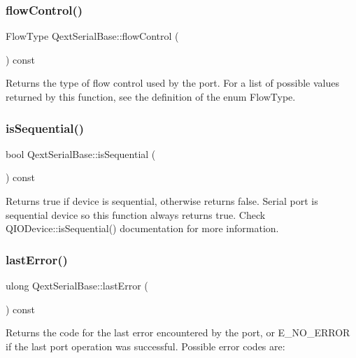 \subsubsection{\texorpdfstring{flow\+Control()}{flowControl()}}
{\footnotesize\ttfamily Flow\+Type Qext\+Serial\+Base\+::flow\+Control (\begin{DoxyParamCaption}{ }\end{DoxyParamCaption}) const\hspace{0.3cm}{\ttfamily [virtual]}}

Returns the type of flow control used by the port. For a list of possible values returned by this function, see the definition of the enum Flow\+Type. \mbox{\label{class_qext_serial_base_ae92ca5d58748d206a379f063e6412f17}} 
\subsubsection{\texorpdfstring{is\+Sequential()}{isSequential()}}
{\footnotesize\ttfamily bool Qext\+Serial\+Base\+::is\+Sequential (\begin{DoxyParamCaption}{ }\end{DoxyParamCaption}) const\hspace{0.3cm}{\ttfamily [virtual]}}

Returns true if device is sequential, otherwise returns false. Serial port is sequential device so this function always returns true. Check Q\+I\+O\+Device\+::is\+Sequential() documentation for more information. \mbox{\label{class_qext_serial_base_a5889db7f578e11db0c7980de3720deea}} 
\subsubsection{\texorpdfstring{last\+Error()}{lastError()}}
{\footnotesize\ttfamily ulong Qext\+Serial\+Base\+::last\+Error (\begin{DoxyParamCaption}{ }\end{DoxyParamCaption}) const\hspace{0.3cm}{\ttfamily [virtual]}}

Returns the code for the last error encountered by the port, or E\+\_\+\+N\+O\+\_\+\+E\+R\+R\+OR if the last port operation was successful. Possible error codes are\+:

